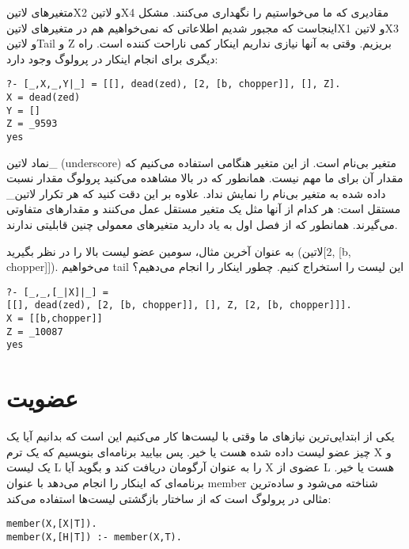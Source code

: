 متغیرهای ‌لاتین{X2} و ‌لاتین{X4} مقادیری که ما می‌خواستیم را نگهداری می‌کنند. مشکل اینجاست که مجبور شدیم اطلاعاتی که نمی‌خواهیم هم در متغیرهای ‌لاتین{X1} و ‌لاتین{X3} و ‌لاتین{Tail} و Z بریزیم. وقتی به آنها نیازی نداریم اینکار کمی ناراحت کننده است. راه دیگری برای انجام اینکار در پرولوگ وجود دارد:

\begin{latin}
\begin{lstlisting}
?- [_,X,_,Y|_] = [[], dead(zed), [2, [b, chopper]], [], Z].
X = dead(zed)
Y = []
Z = _9593
yes
\end{lstlisting}
\end{latin}

نماد ‌لاتین{\_} (underscore) متغیر بی‌نام است. از این متغیر هنگامی استفاده می‌کنیم که مقدار آن برای ما مهم نیست. همانطور که در بالا مشاهده می‌کنید پرولوگ مقدار نسبت داده شده به متغیر بی‌نام را نمایش نداد. علاوه بر این دقت کنید که هر تکرار ‌لاتین{\_} مستقل است: هر کدام از آنها مثل یک متغیر مستقل عمل می‌کنند و مقدارهای متفاوتی می‌گیرند. همانطور که از فصل اول به یاد دارید متغیرهای معمولی چنین قابلیتی ندارند.

به عنوان آخرین مثال، سومین عضو لیست بالا را در نظر بگیرید (‌لاتین{[2, [b, chopper]]}). می‌خواهیم tail این لیست را استخراج کنیم. چطور اینکار را انجام می‌دهیم؟

\begin{latin}
\begin{lstlisting}
?- [_,_,[_|X]|_] =
[[], dead(zed), [2, [b, chopper]], [], Z, [2, [b, chopper]]].
X = [[b,chopper]]
Z = _10087
yes
\end{lstlisting}
\end{latin}

\section{عضویت}

یکی از ابتدایی‌ترین نیازهای ما وقتی با لیست‌ها کار می‌کنیم این است که بدانیم آیا یک چیز عضو لیست داده شده هست یا خیر. پس بیایید برنامه‌ای بنویسیم که یک ترم X و یک لیست L را به عنوان آرگومان دریافت کند و بگوید آیا X عضوی از L هست یا خیر. برنامه‌ای که اینکار را انجام می‌دهد با عنوان member شناخته می‌شود و ساده‌ترین مثالی در پرولوگ است که از ساختار بازگشتی لیست‌ها استفاده می‌کند:

\begin{latin}
\begin{lstlisting}
member(X,[X|T]).
member(X,[H|T]) :- member(X,T).
\end{lstlisting}
\end{latin}

